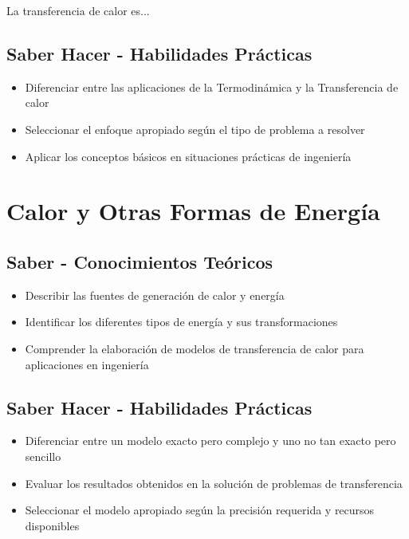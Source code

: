 \documentclass[12pt,a4paper,twoside]{book}
\begin{document}
	La transferencia de calor es...
	
	\subsection{Saber Hacer - Habilidades Prácticas}
	\begin{hacerbox}
		\begin{itemize}
			\item Diferenciar entre las aplicaciones de la Termodinámica y la Transferencia de calor
			\item Seleccionar el enfoque apropiado según el tipo de problema a resolver
			\item Aplicar los conceptos básicos en situaciones prácticas de ingeniería
		\end{itemize}
	\end{hacerbox}
	
	
	\section{Calor y Otras Formas de Energía}
	\label{sec:calor_energia}
	
	\subsection{Saber - Conocimientos Teóricos}
	\begin{saberbox}
		\begin{itemize}
			\item Describir las fuentes de generación de calor y energía
			\item Identificar los diferentes tipos de energía y sus transformaciones
			\item Comprender la elaboración de modelos de transferencia de calor para aplicaciones en ingeniería
		\end{itemize}
	\end{saberbox}
	
	\subsection{Saber Hacer - Habilidades Prácticas}
	\begin{hacerbox}
		\begin{itemize}
			\item Diferenciar entre un modelo exacto pero complejo y uno no tan exacto pero sencillo
			\item Evaluar los resultados obtenidos en la solución de problemas de transferencia
			\item Seleccionar el modelo apropiado según la precisión requerida y recursos disponibles
		\end{itemize}
	\end{hacerbox}
	
\end{document}
